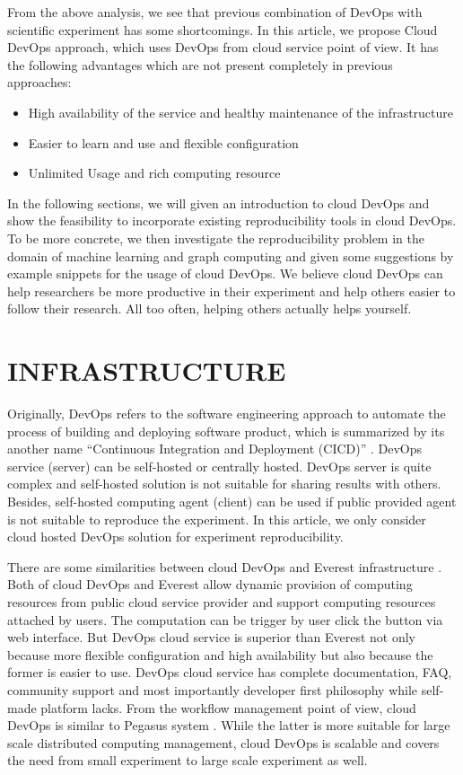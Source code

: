 \documentclass{IEEEcsmag}
\begin{document}
From the above analysis, we see that previous combination of DevOps with scientific experiment has some shortcomings. In this article, we propose Cloud DevOps approach, which uses DevOps from cloud service point of view. It has the following advantages which are not present completely in previous approaches:
\begin{itemize}
	\item High availability of the service and healthy maintenance of the infrastructure
	\item Easier to learn and use and flexible configuration 
	\item Unlimited Usage and rich computing resource
\end{itemize}
 In the following sections, we will given an introduction to cloud DevOps and show the feasibility to incorporate existing reproducibility tools in cloud DevOps. To be more concrete, we then investigate the reproducibility problem in the domain of machine learning and graph computing and  given some suggestions by example snippets for the usage of cloud DevOps. We believe cloud DevOps can help researchers be more productive in their experiment and help others easier to follow their research. All too often, helping others actually helps yourself.

\section{INFRASTRUCTURE}
Originally, DevOps refers to the software engineering approach to automate the process of building and deploying software product, which is summarized by its another name ``Continuous Integration and Deployment (CICD)'' \cite{bass2015devops}. 
DevOps service (server) can be self-hosted or centrally hosted. DevOps server is quite complex and self-hosted solution is not suitable for sharing results with others. Besides, self-hosted computing agent (client) can be used if public provided agent is not suitable to reproduce the experiment. In this article, we only consider cloud hosted DevOps solution for experiment reproducibility.

There are some similarities between cloud DevOps and Everest infrastructure \cite{GavishD12} . Both of cloud DevOps and Everest allow dynamic provision of computing resources from public cloud service provider and support computing resources attached by users. The computation can be trigger by user click the button via web interface. But DevOps cloud service is superior than Everest not only because more flexible configuration and high availability but also because the former is easier to use. DevOps cloud service has complete documentation, FAQ, community support and most importantly developer first philosophy while self-made platform lacks.  From the workflow management point of view, cloud DevOps is similar to Pegasus system \cite{Pegasus}. While the latter is more suitable for large scale distributed computing management, cloud DevOps is scalable and covers the need from small experiment to large scale experiment as well.
\end{document}
